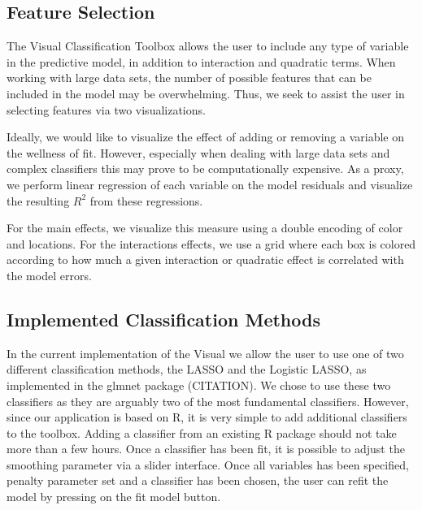 \documentclass[tog]{acmsiggraph}
\begin{document}
\subsection*{Feature Selection}
The Visual Classification Toolbox allows the user to include any type of variable in the predictive model, in addition to interaction and quadratic terms. When working with large data sets, the number of possible features that can be included in the model may be overwhelming. Thus, we seek to assist the user in selecting features via two visualizations. 

Ideally, we would like to visualize the effect of adding or removing a variable on the wellness of fit. However, especially when dealing with large data sets and complex classifiers this may prove to be computationally expensive. As a proxy, we perform linear regression of each variable on the model residuals and visualize the resulting $R^2$ from these regressions. 

For the main effects, we visualize this measure using a double encoding of color and locations. For the interactions effects, we use a grid where each box is colored according to how much a given interaction or quadratic effect is correlated with the model errors. 

\subsection*{Implemented Classification Methods}
In the current implementation of the Visual we allow the user to use one of two different classification methods, the LASSO and the Logistic LASSO, as implemented in the glmnet package (CITATION). We chose to use these two classifiers as they are arguably two of the most fundamental classifiers. However, since our application is based on R, it is very simple to add additional classifiers to the toolbox. Adding a classifier from an existing R package should not take more than a few hours. Once a classifier has been fit, it is possible to adjust the smoothing parameter via a slider interface. Once all variables has been specified, penalty parameter set and a classifier has been chosen, the user can refit the model by pressing on the fit model button.
\end{document}

